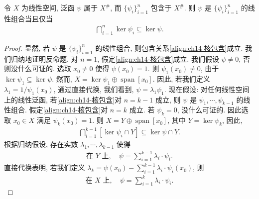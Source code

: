 \documentclass[../../main.tex]{subfiles}
\begin{document}
\begin{proposition}\label{proposition:ch14-核交}
令 $X$ 为线性空间, 泛函 $\psi$ 属于 $X^{\#}$, 而 $\{\psi_{i}\}_{i=1}^{n}$ 包含于 $X^{\#}$. 则 $\psi$ 是 $\{\psi_{i}\}_{i=1}^{n}$ 的线性组合当且仅当
\begin{align}
\bigcap_{i=1}^{n}\ker\psi_{i}\subseteq\ker\psi.\label{align:ch14-核包含}
\end{align}
\end{proposition}

\begin{proof}
显然, 若 $\psi$ 是 $\{\psi_{i}\}_{i=1}^{n}$ 的线性组合, 则包含关系\eqref{align:ch14-核包含}成立. 我们归纳地证明反命题. 对 $n=1$, 假定\eqref{align:ch14-核包含}成立. 我们假设 $\psi\neq 0$, 否则没什么可证的. 选取 $x_{0}\neq 0$ 使得 $\psi(x_{0})=1$. 则 $\psi_{1}(x_{0})\neq 0$, 由于 $\ker\psi_{1}\subseteq\ker\psi$. 然而, $X=\ker\psi_{1}\oplus\operatorname{span}[x_{0}]$. 因此, 若我们定义 $\lambda_{1}=1/\psi_{1}(x_{0})$, 通过直接代换, 我们看到, $\psi=\lambda_{1}\psi_{1}$. 现在假设: 对任何线性空间上的线性泛函, 若\eqref{align:ch14-核包含}对 $n=k-1$ 成立, 则 $\psi$ 是 $\psi_{1},\cdots,\psi_{k-1}$ 的线性组合. 假定\eqref{align:ch14-核包含}对 $n=k$ 成立. 若 $\psi_{k}=0$, 没什么可证的. 因此选取 $x_{0}\in X$ 满足 $\psi_{k}(x_{0})=1$. 则 $X=Y\oplus\operatorname{span}[x_{0}]$, 其中 $Y=\ker\psi_{k}$, 因此,
\begin{align*}
\bigcap_{i=1}^{k-1}[\ker\psi_{i}\cap Y]\subseteq\ker\psi\cap Y.
\end{align*}
根据归纳假设, 存在实数 $\lambda_{1},\cdots,\lambda_{k-1}$ 使得
\begin{align*}
\text{在 }Y\text{ 上},\quad\psi=\sum_{i=1}^{k-1}\lambda_{i}\cdot\psi_{i}.
\end{align*}
直接代换表明, 若我们定义 $\lambda_{k}=\psi(x_{0})-\sum_{i=1}^{k-1}\lambda_{i}\cdot\psi_{i}(x_{0})$, 则
\begin{align*}
\text{在 }X\text{ 上},\quad\psi=\sum_{i=1}^{k}\lambda_{i}\cdot\psi_{i}.
\end{align*}
\end{proof}
\end{document}
